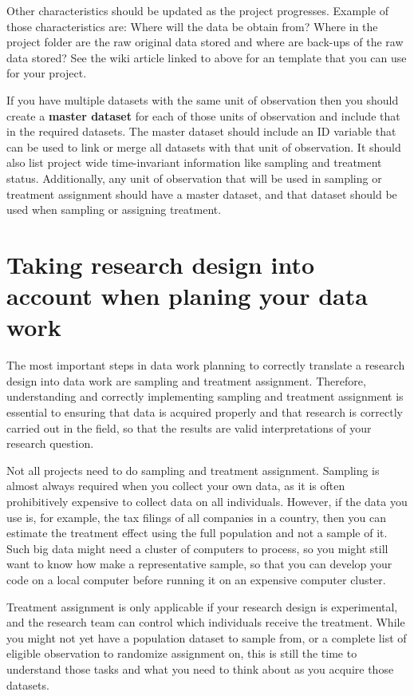 Other characteristics should be updated as the project progresses.
Example of those characteristics are:
Where will the data be obtain from?
Where in the project folder are the raw original data stored
and where are back-ups of the raw data stored?
See the wiki article linked to above for an template that you can use for your project.

If you have multiple datasets with the same unit of observation
then you should create a \textbf{master dataset}
for each of those units of observation and include that in the required datasets.
The master dataset should include an ID variable
that can be used to link or merge all datasets with that unit of observation.
It should also list project wide time-invariant information
like sampling and treatment status.
Additionally, any unit of observation
that will be used in sampling or treatment assignment
should have a master dataset,
and that dataset should be used when sampling or assigning treatment.

\section{Taking research design into account when planing your data work}

The most important steps in data work planning
to correctly translate a research design into data work
are sampling and treatment assignment.
Therefore, understanding and correctly implementing sampling and treatment assignment
is essential to ensuring that data is acquired properly and that research
is correctly carried out in the field, so that the results
are valid interpretations of your research question.

Not all projects need to do sampling and treatment assignment.
Sampling is almost always required when you collect your own data,
as it is often prohibitively expensive to collect data on all individuals.
However, if the data you use is, for example,
the tax filings of all companies in a country,
then you can estimate the treatment effect
using the full population and not a sample of it.
Such big data might need a cluster of computers to process,
so you might still want to know how make a representative sample,
so that you can develop your code on a local computer
before running it on an expensive computer cluster.

Treatment assignment is only applicable if your research design is experimental,
and the research team can control which individuals receive the treatment.
While you might not yet have a population dataset to sample from,
or a complete list of eligible observation to randomize assignment on,
this is still the time to understand those tasks
and what you need to think about as you acquire those datasets.


